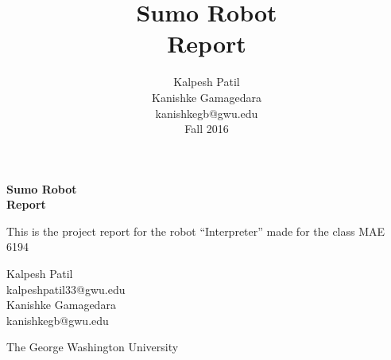 \thispagestyle{empty}

\begin{center}


\vspace*{.5cm}

\title{ \bfseries Sumo Robot \\ Report}
\author{Kalpesh Patil \\ Kanishke Gamagedara\\ {\normalsize kanishkegb@gwu.edu}\\{\normalsize Fall 2016}}

\vspace{10 mm}
 {\bf \color{MidnightBlue} {\Huge Sumo Robot }\\ \vspace{4mm} {\Huge Report}}\\

\vspace*{6cm}

{\large This is the project report for the robot ``Interpreter'' made for the class MAE 6194 }

\vspace*{5cm}

{\large Kalpesh Patil \\ {\normalsize kalpeshpatil33@gwu.edu }\\ \vspace*{5mm} Kanishke Gamagedara}\\ 
{\normalsize kanishkegb@gwu.edu}\\\vspace*{5mm}{\large Spring 2017}

\vspace*{3cm}

{\LARGE 
The George Washington University}

\end{center}
